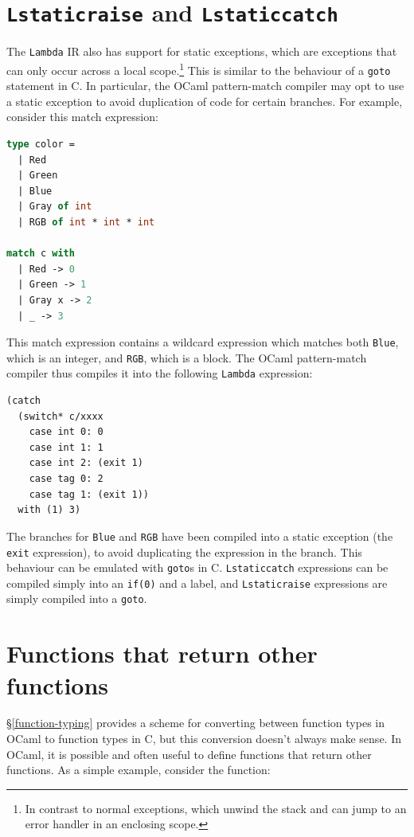 \section{\texttt{Lstaticraise} and \texttt{Lstaticcatch}}

The \texttt{Lambda} IR also has support for static exceptions, which are
exceptions that can only occur across a local scope.\footnote{In contrast to
normal exceptions, which unwind the stack and can jump to an error handler in an
enclosing scope.} This is similar to the behaviour of a \texttt{goto} statement
in C. In particular, the OCaml pattern-match compiler may opt to use a static
exception to avoid duplication of code for certain branches. For example,
consider this match expression:

\begin{lstlisting}[language=Caml]
type color =
  | Red
  | Green
  | Blue
  | Gray of int
  | RGB of int * int * int

match c with
  | Red -> 0
  | Green -> 1
  | Gray x -> 2
  | _ -> 3
\end{lstlisting}

This match expression contains a wildcard expression which matches both 
\texttt{Blue}, which is an integer, and \texttt{RGB}, which is a block. The 
OCaml pattern-match compiler thus compiles it into the following 
\texttt{Lambda} expression:

\begin{lstlisting}
(catch
  (switch* c/xxxx
    case int 0: 0
    case int 1: 1
    case int 2: (exit 1)
    case tag 0: 2
    case tag 1: (exit 1))
  with (1) 3)
\end{lstlisting}

The branches for \texttt{Blue} and \texttt{RGB} have been compiled into a static
exception (the \texttt{exit} expression), to avoid duplicating the expression in
the branch. This behaviour can be emulated with \texttt{goto}s in C.
\texttt{Lstaticcatch} expressions can be compiled simply into an \texttt{if(0)}
and a label, and \texttt{Lstaticraise} expressions are simply compiled into a
\texttt{goto}.

\section{Functions that return other functions}\label{incomplete-funcs}

\S\ref{function-typing} provides a scheme for converting between function types
in OCaml to function types in C, but this conversion doesn't always make sense.
In OCaml, it is possible and often useful to define functions that return other
functions. As a simple example, consider the function:

